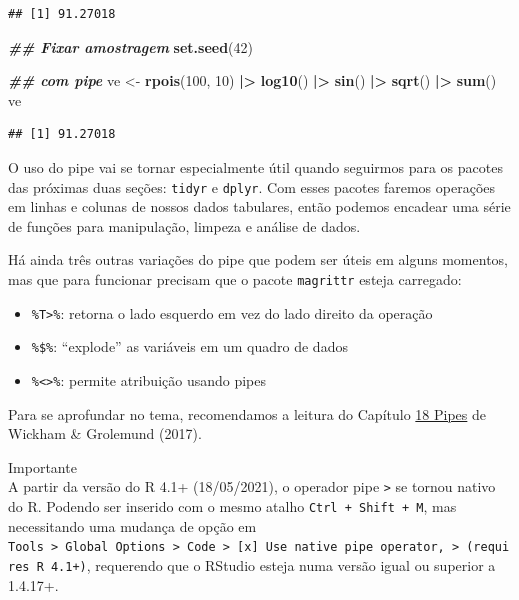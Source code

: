 \documentclass[
]{article}
\newenvironment{Shaded}{\begin{snugshade}}{\end{snugshade}}
\newcommand{\DecValTok}[1]{\textcolor[rgb]{0.00,0.00,0.81}{#1}}
\newcommand{\DocumentationTok}[1]{\textcolor[rgb]{0.56,0.35,0.01}{\textbf{\textit{#1}}}}
\newcommand{\FunctionTok}[1]{\textcolor[rgb]{0.13,0.29,0.53}{\textbf{#1}}}
\newcommand{\NormalTok}[1]{#1}
\newcommand{\OtherTok}[1]{\textcolor[rgb]{0.56,0.35,0.01}{#1}}
\newcommand{\SpecialCharTok}[1]{\textcolor[rgb]{0.81,0.36,0.00}{\textbf{#1}}}
\providecommand{\tightlist}{%
  \setlength{\itemsep}{0pt}\setlength{\parskip}{0pt}}
\begin{document}
\begin{verbatim}
## [1] 91.27018
\end{verbatim}

\begin{Shaded}
\begin{Highlighting}[]
\DocumentationTok{\#\# Fixar amostragem}
\FunctionTok{set.seed}\NormalTok{(}\DecValTok{42}\NormalTok{)}

\DocumentationTok{\#\# com pipe}
\NormalTok{ve }\OtherTok{\textless{}{-}} \FunctionTok{rpois}\NormalTok{(}\DecValTok{100}\NormalTok{, }\DecValTok{10}\NormalTok{) }\SpecialCharTok{|\textgreater{}} 
    \FunctionTok{log10}\NormalTok{() }\SpecialCharTok{|\textgreater{}}
    \FunctionTok{sin}\NormalTok{() }\SpecialCharTok{|\textgreater{}} 
    \FunctionTok{sqrt}\NormalTok{() }\SpecialCharTok{|\textgreater{}} 
    \FunctionTok{sum}\NormalTok{()}
\NormalTok{ve}
\end{Highlighting}
\end{Shaded}

\begin{verbatim}
## [1] 91.27018
\end{verbatim}

O uso do pipe vai se tornar especialmente útil quando seguirmos para os pacotes das próximas duas seções: \texttt{tidyr} e \texttt{dplyr}. Com esses pacotes faremos operações em linhas e colunas de nossos dados tabulares, então podemos encadear uma série de funções para manipulação, limpeza e análise de dados.

Há ainda três outras variações do pipe que podem ser úteis em alguns momentos, mas que para funcionar precisam que o pacote \texttt{magrittr} esteja carregado:

\begin{itemize}
\tightlist
\item
  \texttt{\%T\textgreater{}\%}: retorna o lado esquerdo em vez do lado direito da operação
\item
  \texttt{\%\$\%}: ``explode'' as variáveis em um quadro de dados
\item
  \texttt{\%\textless{}\textgreater{}\%}: permite atribuição usando pipes
\end{itemize}

Para se aprofundar no tema, recomendamos a leitura do Capítulo \href{https://r4ds.had.co.nz/pipes.html}{18 Pipes} de Wickham \& Grolemund (2017).

Importante \\
A partir da versão do R 4.1+ (18/05/2021), o operador pipe \texttt{\textbar{}\textgreater{}} se tornou nativo do R. Podendo ser inserido com o mesmo atalho \texttt{Ctrl\ +\ Shift\ +\ M}, mas necessitando uma mudança de opção em \texttt{Tools\ \textgreater{}\ Global\ Options\ \textgreater{}\ Code\ \textgreater{}\ {[}x{]}\ Use\ native\ pipe\ operator,\ \textbar{}\textgreater{}\ (requires\ R\ 4.1+)}, requerendo que o RStudio esteja numa versão igual ou superior a 1.4.17+.
\end{document}
